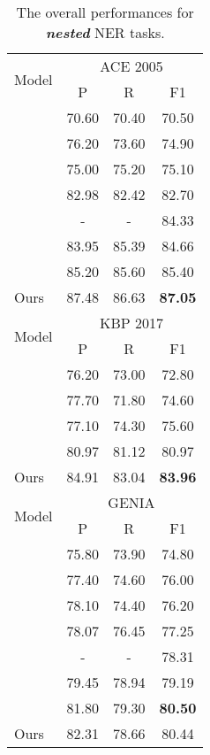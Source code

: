 \documentclass{article}
\begin{document}
\begin{table}
\begin{tabular}{lccc}
\bottomrule
\toprule
\multirow{2}{*}{Model}   & \multicolumn{3}{c}{ACE 2005}  \\
 \cmidrule(lr){2-4} 
& P  & R & F1  \\
\midrule
\citep{katiyar2018nested}  & 70.60 & 70.40 & 70.50 \\
\citep{lin2019sequence}       & 76.20  & 73.60 & 74.90  \\
\citep{luo-zhao-2020-bipartite}       & 75.00  & 75.20  & 75.10    \\
\citep{shibuya2019nested}   & 82.98  & 82.42  & 82.70 \\
\citep{strakova2019neural}  & - & - &  84.33  \\
\citep{jue2020pyramid}       & 83.95  & 85.39  & 84.66     \\
\citep{yu2020named}       & 85.20  & 85.60  & 85.40     \\
\midrule
Ours    & 87.48   & 86.63 & \textbf{87.05}  \\
\bottomrule
\toprule
\multirow{2}{*}{Model}   & \multicolumn{3}{c}{KBP 2017}  \\
 \cmidrule(lr){2-4} 
& P  & R & F1  \\
\midrule
\citep{DBLP:conf/tac/JiPZNMMC17}       & 76.20 & 73.00 & 72.80  \\
\citep{lin2019sequence}       & 77.70  & 71.80 & 74.60  \\
\citep{luo-zhao-2020-bipartite}       & 77.10 & 74.30 & 75.60  \\
\citep{li-etal-2020-unified}       & 80.97  & 81.12  & 80.97  \\
\midrule
Ours    & 84.91  & 83.04  & \textbf{83.96}  \\
\bottomrule
\toprule
\multirow{2}{*}{Model}   & \multicolumn{3}{c}{GENIA}  \\
 \cmidrule(lr){2-4} 
& P  & R & F1  \\
\midrule
\citep{lin2019sequence}       & 75.80  & 73.90 & 74.80  \\
\citep{luo-zhao-2020-bipartite}       & 77.40  & 74.60  & 76.00    \\
\citep{wang-etal-2020-hit}       & 78.10  & 74.40  & 76.20  \\
\citep{shibuya2019nested}   & 78.07 & 76.45 & 77.25 \\
\citep{strakova2019neural}  & - & - &  78.31 \\
\citep{jue2020pyramid}       & 79.45  & 78.94  & 79.19     \\
\citep{yu2020named}       & 81.80  & 79.30  & \textbf{80.50}     \\
\midrule
Ours    & 82.31 & 78.66  & 80.44  \\
\bottomrule

\end{tabular}
\caption{The overall performances for \textit{\textbf{nested}} NER tasks.}
\label{tab:nested}
\end{table}
\end{document}
